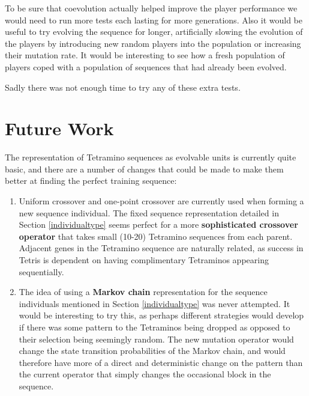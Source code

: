 \documentclass[a4paper,11pt]{article}
\begin{document}
To be sure that coevolution actually helped improve the player performance we
would need to run more tests each lasting for more generations.
Also it would be useful to try evolving the sequence for longer, artificially
slowing the evolution of the players by introducing new random players into the
population or increasing their mutation rate.
It would be interesting to see how a fresh population of players coped with a
population of sequences that had already been evolved.

Sadly there was not enough time to try any of these extra tests.

\section{Future Work}

The representation of Tetramino sequences as evolvable units is currently quite
basic, and there are a number of changes that could be made to make them better
at finding the perfect training sequence:

\begin{enumerate}
  \item Uniform crossover and one-point crossover are currently used when
      forming a new sequence individual.
      The fixed sequence representation detailed in Section \ref{individualtype}
      seems perfect for a more \textbf{sophisticated crossover operator}
      that takes small (10-20) Tetramino sequences from each parent.
      Adjacent genes in the Tetramino sequence are naturally related, as
      success in Tetris is dependent on having complimentary Tetraminos
      appearing sequentially.
  \item The idea of using a \textbf{Markov chain} representation for the
      sequence individuals mentioned in Section \ref{individualtype} was never
      attempted.
      It would be interesting to try this, as perhaps different strategies
      would develop if there was some pattern to the Tetraminos being dropped
      as opposed to their selection being seemingly random.
      The new mutation operator would change the state transition probabilities
      of the Markov chain, and would therefore have more of a direct and
      deterministic change on the pattern than the current operator that simply
      changes the occasional block in the sequence.
\end{enumerate}

\clearpage


\appendix
\clearpage
\end{document}
